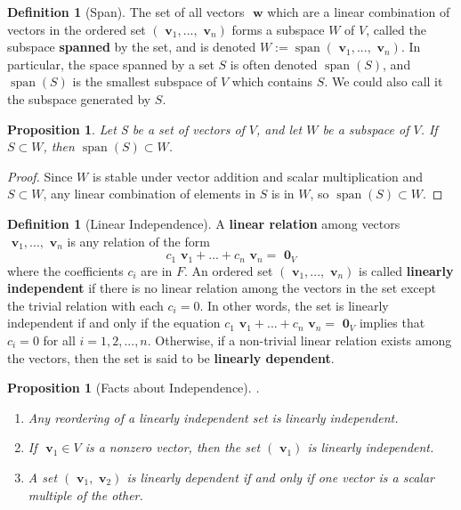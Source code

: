 \documentclass[12pt]{article}
\newtheorem{prop}[thm]{Proposition}
\theoremstyle{definition}
\newtheorem{defn}[thm]{Definition}
\theoremstyle{remark}
\numberwithin{equation}{section}
\newcommand\B[1]{\textbf{ #1}}
\DeclareMathOperator{\spn}{span}
\begin{document}
\vspace{15pt}

\begin{defn}[Span]
        The set of all vectors $\B{w}$ which are a linear combination of vectors in the ordered set $(\B{v}_1,...,\B{v}_n)$ forms a subspace $W$ of $V$, called the subspace \B{spanned} by the set, and is denoted $W:=\spn(\B{v}_1,...,\B{v}_n)$. In particular, the space spanned by a set $S$ is often denoted $\spn(S)$, and $\spn(S)$ is the smallest subspace of $V$ which contains $S$. We could also call it the subspace generated by $S$.
\end{defn}

\vspace{15pt}

\begin{prop}
        Let S be a set of vectors of $V$, and let $W$ be a subspace of $V$. If $S \subset W$, then $\spn(S) \subset W$.
\end{prop}
\begin{proof}
        Since $W$ is stable under vector addition and scalar multiplication and $S \subset W$, any linear combination of elements in $S$ is in $W$, so $\spn(S) \subset W$.
\end{proof}

\vspace{15pt}

\begin{defn}[Linear Independence]
        A \B{linear relation} among vectors $\B{v}_1,...,\B{v}_n$ is any relation of the form \begin{equation}
                c_1\B{v}_1+...+c_n\B{v}_n = \B{0}_V
        \end{equation}
        where the coefficients $c_i$ are in $F$. An ordered set $(\B{v}_1,...,\B{v}_n)$ is called \B{linearly independent} if there is no linear relation among the vectors in the set except the trivial relation with each $c_i = 0$. In other words, the set is linearly independent if and only if the equation $c_1\B{v}_1+...+c_n\B{v}_n = \B{0}_V$ implies that $c_i = 0$ for all $i = 1,2,...,n$. Otherwise, if a non-trivial linear relation exists among the vectors, then the set is said to be \B{linearly dependent}.
\end{defn}


\vspace{15pt}

\begin{prop}[Facts about Independence]
        .\newline \begin{enumerate}
                \item Any reordering of a linearly independent set is linearly independent.
                \item If $\B{v}_1 \in V$ is a nonzero vector, then the set $(\B{v}_1)$ is linearly independent.
                \item A set $(\B{v}_1,\B{v}_2)$ is linearly dependent if and only if one vector is a scalar multiple of the other.
        \end{enumerate}
\end{prop}
\end{document}
